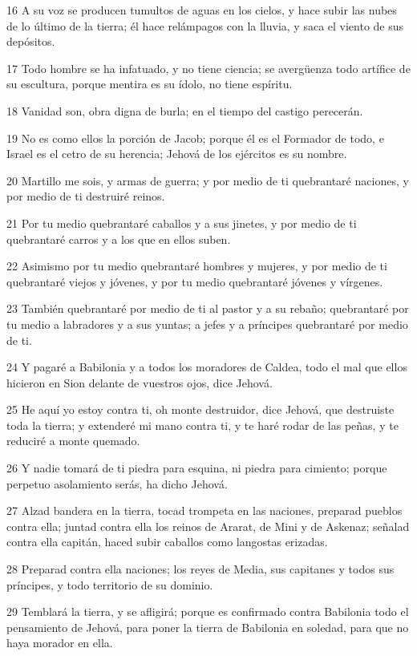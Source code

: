 \par 16 A su voz se producen tumultos de aguas en los cielos, y hace subir las nubes de lo último de la tierra; él hace relámpagos con la lluvia, y saca el viento de sus depósitos.
\par 17 Todo hombre se ha infatuado, y no tiene ciencia; se avergüenza todo artífice de su escultura, porque mentira es su ídolo, no tiene espíritu.
\par 18 Vanidad son, obra digna de burla; en el tiempo del castigo perecerán.
\par 19 No es como ellos la porción de Jacob; porque él es el Formador de todo, e Israel es el cetro de su herencia; Jehová de los ejércitos es su nombre.
\par 20 Martillo me sois, y armas de guerra; y por medio de ti quebrantaré naciones, y por medio de ti destruiré reinos.
\par 21 Por tu medio quebrantaré caballos y a sus jinetes, y por medio de ti quebrantaré carros y a los que en ellos suben.
\par 22 Asimismo por tu medio quebrantaré hombres y mujeres, y por medio de ti quebrantaré viejos y jóvenes, y por tu medio quebrantaré jóvenes y vírgenes.
\par 23 También quebrantaré por medio de ti al pastor y a su rebaño; quebrantaré por tu medio a labradores y a sus yuntas; a jefes y a príncipes quebrantaré por medio de ti.
\par 24 Y pagaré a Babilonia y a todos los moradores de Caldea, todo el mal que ellos hicieron en Sion delante de vuestros ojos, dice Jehová.
\par 25 He aquí yo estoy contra ti, oh monte destruidor, dice Jehová, que destruiste toda la tierra; y extenderé mi mano contra ti, y te haré rodar de las peñas, y te reduciré a monte quemado.
\par 26 Y nadie tomará de ti piedra para esquina, ni piedra para cimiento; porque perpetuo asolamiento serás, ha dicho Jehová.
\par 27 Alzad bandera en la tierra, tocad trompeta en las naciones, preparad pueblos contra ella; juntad contra ella los reinos de Ararat, de Mini y de Askenaz; señalad contra ella capitán, haced subir caballos como langostas erizadas.
\par 28 Preparad contra ella naciones; los reyes de Media, sus capitanes y todos sus príncipes, y todo territorio de su dominio.
\par 29 Temblará la tierra, y se afligirá; porque es confirmado contra Babilonia todo el pensamiento de Jehová, para poner la tierra de Babilonia en soledad, para que no haya morador en ella.

